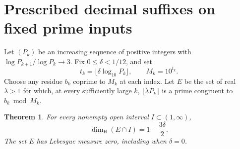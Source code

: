 \documentclass[11pt]{article}
\newtheorem{theorem}{Theorem}
\theoremstyle{remark}\newtheorem*{remark}{Remark}
\begin{document}
\section{Prescribed decimal suffixes on fixed prime inputs}\label{sec:suffix}

Let $(P_k)$ be an increasing sequence of positive integers with
$\log P_{k+1}/\log P_k\to3$. Fix $0\le\delta<1/12$, and set
\[
 t_k=\lfloor\delta\log_{10}P_k\rfloor,\qquad M_k=10^{t_k}.
\]
Choose any residue $b_k$ coprime to $M_k$ at each index. Let $E$ be the
set of real $\lambda>1$ for which, at every sufficiently large $k$,
$\lfloor\lambda P_k\rfloor$ is a prime congruent to $b_k\bmod M_k$.

\begin{theorem}\label{thm:suffix-dimension}
For every nonempty open interval $I\subset(1,\infty)$,
\[
                 \dim_{\mathrm H}(E\cap I)=1-\frac{3\delta}{2}.
\]
The set $E$ has Lebesgue measure zero, including when $\delta=0$.
\end{theorem}
\end{document}
